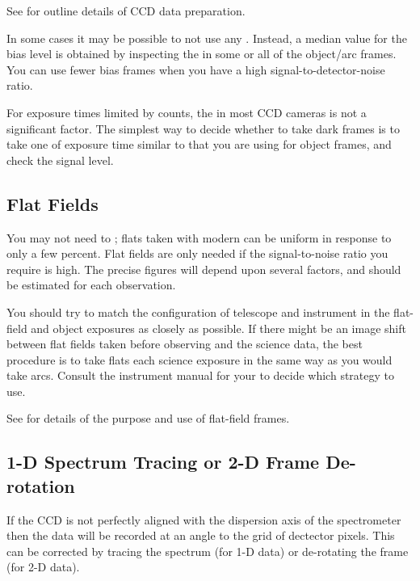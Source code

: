 See \scspec{\S\ref{image_preparation}}
{}
for outline details of CCD data preparation.

In some cases it may be possible to not use any
.  Instead,
a median value for the bias level is obtained by inspecting the
 in some or all of the
object/arc frames.
You can use fewer bias frames when you have a high
signal-to-detector-noise ratio.

For exposure times limited by 
counts, the  in most CCD cameras
is not a significant factor.
The simplest way to decide whether to take dark frames is to take one
of exposure time similar to that you are using for object frames, and
check the signal level.


\subsection{Flat Fields}

You may not need to ;
flats taken with modern  can be
uniform in response to only a few percent.
Flat fields are only needed if the signal-to-noise ratio
you require is high.
The precise figures will depend upon several factors,
and should be estimated for each observation.

You should try to match the configuration of telescope and instrument
in the flat-field and object exposures as closely as possible.
If there might be an image shift between flat fields taken before
observing and the science data, the best procedure is to take flats
 each science exposure in the same
way as you would take arcs.  Consult the instrument manual for your
 to decide which strategy
to use.

See \scspec{\S\ref{flat_fielding}}
{} for details of
the purpose and use of flat-field frames.


\subsection{1-D Spectrum Tracing or 2-D Frame De-rotation}

If the CCD is not perfectly aligned with the dispersion axis of the
spectrometer then the data will be recorded at an angle to the grid of
dectector pixels. This can be corrected by tracing the spectrum (for
1-D data) or de-rotating the frame (for 2-D data).

